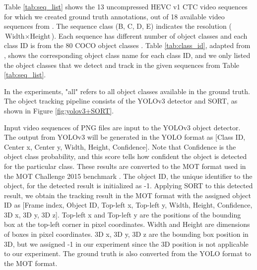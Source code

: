 
Table \ref{tab:seq_list} shows the 13 uncompressed HEVC v1 CTC video sequences for which we created ground truth annotations, out of 18 available video sequences from \cite{choi_dataset_2021}. The sequence class (B, C, D, E) indicates the resolution ($\text{Width} \times \text{Height}$). Each sequence has different number of object classes and each class ID is from the 80 COCO object classes \cite{lin_microsoft_2014}. Table \ref{tab:class_id}, adapted from \cite{choi_dataset_2021}, shows the corresponding object class name for each class ID, and we only listed the object classes that we detect and track in the given sequences from Table \ref{tab:seq_list}.

In the experiments, "all" refers to all object classes available in the ground truth. The object tracking pipeline consists of the YOLOv3 detector and SORT, as shown in Figure \ref{fig:yolov3+SORT}. 

Input video sequences of PNG files are input to the YOLOv3 object detector. The output from YOLOv3 will be generated in the YOLO format as [Class ID, Center x, Center y, Width, Height, Confidence]. Note that Confidence is the object class probability, and this score tells how confident the object is detected for the particular class. These results are converted to the MOT format used in the MOT Challenge 2015 benchmark \cite{leal-taixe_motchallenge_2015}. The object ID, the unique identifier to the object, for the detected result is initialized as -1. Applying SORT to this detected result, we obtain the tracking result in the MOT format with the assigned object ID as [Frame index, Object ID, Top-left x, Top-left y, Width, Height, Confidence, 3D x, 3D y, 3D z]. Top-left x and Top-left y are the positions of the bounding box at the top-left corner in pixel coordinates. Width and Height are dimensions of boxes in pixel coordinates. 3D x, 3D y, 3D z are the bounding box position in 3D, but we assigned -1 in our experiment since the 3D position is not applicable to our experiment. The ground truth is also converted from the YOLO format to the MOT format.



